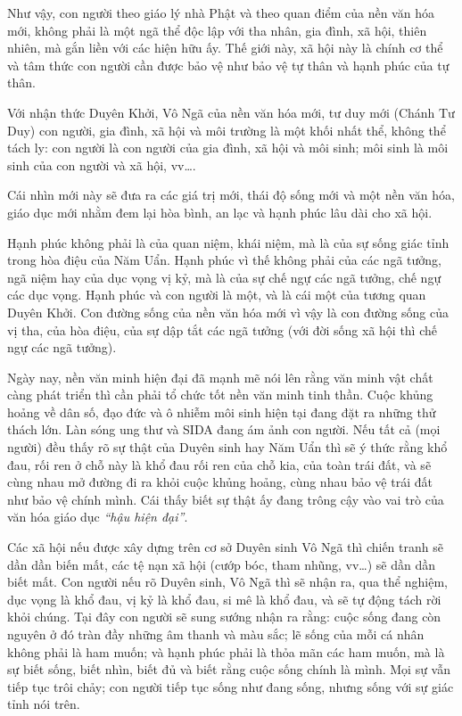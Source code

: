 Như vậy, con người theo giáo lý nhà Phật và theo quan điểm của nền văn hóa mới, không phải là một ngã thể độc lập với tha nhân, gia đình, xã hội, thiên nhiên, mà gắn liền với các hiện hữu ấy. Thế giới này, xã hội này là chính cơ thể và tâm thức con người cần được bảo vệ như bảo vệ tự thân và hạnh phúc của tự thân.

Với nhận thức Duyên Khởi, Vô Ngã của nền văn hóa mới, tư duy mới (Chánh Tư Duy) con người, gia đình, xã hội và môi trường là một khối nhất thể, không thể tách ly: con người là con người của gia đình, xã hội và môi sinh; môi sinh là môi sinh của con người và xã hội, vv\ldots.

Cái nhìn mới này sẽ đưa ra các giá trị mới, thái độ sống mới và một nền văn hóa, giáo dục mới nhằm đem lại hòa bình, an lạc và hạnh phúc lâu dài cho xã hội.

Hạnh phúc không phải là của quan niệm, khái niệm, mà là của sự sống giác tỉnh trong hòa điệu của Năm Uẩn. Hạnh phúc vì thế không phải của các ngã tưởng, ngã niệm hay của dục vọng vị kỷ, mà là của sự chế ngự các ngã tưởng, chế ngự các dục vọng. Hạnh phúc và con người là một, và là cái một của tương quan Duyên Khởi. Con đường sống của nền văn hóa mới vì vậy là con đường sống của vị tha, của hòa điệu, của sự dập tắt các ngã tưởng (với đời sống xã hội thì chế ngự các ngã tưởng).

Ngày nay, nền văn minh hiện đại đã mạnh mẽ nói lên rằng văn minh vật chất càng phát triển thì cần phải tổ chức tốt nền văn minh tinh thần. Cuộc khủng hoảng về dân số, đạo đức và ô nhiễm môi sinh hiện tại đang đặt ra những thử thách lớn. Làn sóng ung thư và SIDA đang ám ảnh con người. Nếu tất cả (mọi người) đều thấy rõ sự thật của Duyên sinh hay Năm Uẩn thì sẽ ý thức rằng khổ đau, rối ren ở chỗ này là khổ đau rối ren của chỗ kia, của toàn trái đất, và sẽ cùng nhau mở đường đi ra khỏi cuộc khủng hoảng, cùng nhau bảo vệ trái đất như bảo vệ chính mình. Cái thấy biết sự thật ấy đang trông cậy vào vai trò của văn hóa giáo dục \emph{``hậu hiện đại''}.

Các xã hội nếu được xây dựng trên cơ sở Duyên sinh Vô Ngã thì chiến tranh sẽ dần dần biến mất, các tệ nạn xã hội (cướp bóc, tham nhũng, vv\ldots) sẽ dần dần biết mất. Con người nếu rõ Duyên sinh, Vô Ngã thì sẽ nhận ra, qua thể nghiệm, dục vọng là khổ đau, vị kỷ là khổ đau, si mê là khổ đau, và sẽ tự động tách rời khỏi chúng. Tại đây con người sẽ sung sướng nhận ra rằng: cuộc sống đang còn nguyên ở đó tràn đầy những âm thanh và màu sắc; lẽ sống của mỗi cá nhân không phải là ham muốn; và hạnh phúc phải là thỏa mãn các ham muốn, mà là sự biết sống, biết nhìn, biết đủ và biết rằng cuộc sống chính là mình. Mọi sự vẫn tiếp tục trôi chảy; con người tiếp tục sống như đang sống, nhưng sống với sự giác tỉnh nói trên.

